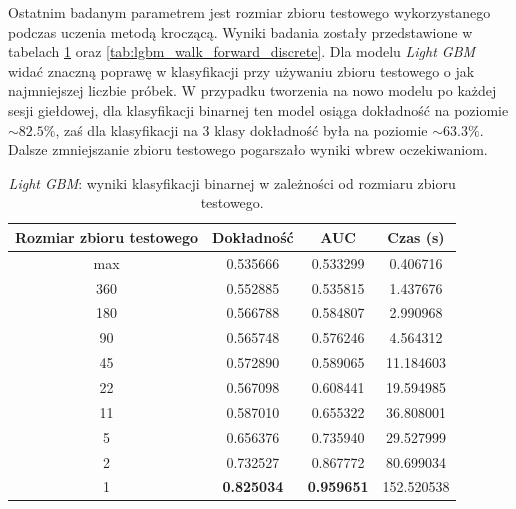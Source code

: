 \documentclass[a4paper, twoside, 11pt, openright]{article}
\begin{document}
Ostatnim badanym parametrem jest rozmiar zbioru testowego wykorzystanego podczas uczenia metodą kroczącą. Wyniki badania zostały przedstawione w tabelach \ref{tab:lgbm_walk_forward_binary} oraz \ref{tab:lgbm_walk_forward_discrete}. Dla modelu \textit{Light GBM} widać znaczną poprawę w klasyfikacji przy używaniu zbioru testowego o jak najmniejszej liczbie próbek. W przypadku tworzenia na nowo modelu po każdej sesji giełdowej, dla klasyfikacji binarnej ten model osiąga dokładność na poziomie $\sim 82.5\%$, zaś dla klasyfikacji na 3 klasy dokładność była na poziomie $\sim 63.3\%$. Dalsze zmniejszanie zbioru testowego pogarszało wyniki wbrew oczekiwaniom.

\begin{table}[H]
    \centering
    \begin{tabular}{|c|c|c|c|}
    \hline
        \textbf{Rozmiar zbioru testowego} & \textbf{Dokładność} & \textbf{AUC} & \textbf{Czas (s)} \\ \hline
max   						  & 0.535666 &  0.533299 &  0.406716 \\ \hline
360                         &  0.552885 &  0.535815 &    1.437676 \\ \hline
180                        &  0.566788 &  0.584807 &    2.990968 \\ \hline
90                         &  0.565748 &  0.576246 &    4.564312 \\ \hline
45                         &  0.572890 &  0.589065 &   11.184603 \\ \hline
22                          &  0.567098 &  0.608441 &   19.594985 \\ \hline
11                          &  0.587010 &  0.655322 &   36.808001 \\ \hline
5                           &  0.656376 &  0.735940 &   29.527999 \\ \hline
2                           &  0.732527 &  0.867772 &   80.699034 \\ \hline
1                           &  \textbf{0.825034} &  \textbf{0.959651} &  152.520538 \\ \hline

    \end{tabular}
    \caption{\textit{Light GBM}: wyniki klasyfikacji binarnej w zależności od rozmiaru zbioru testowego.}
    \label{tab:lgbm_walk_forward_binary}
\end{table}
\end{document}
